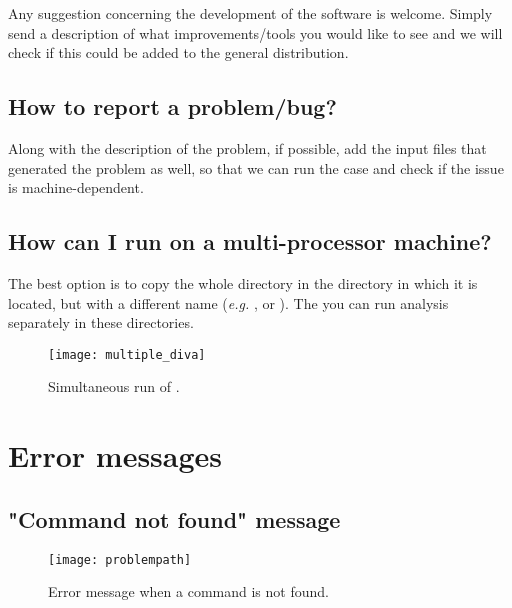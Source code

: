 Any suggestion concerning the development of the software is welcome. Simply send a description of what improvements/tools you would like to see and we will check if this could be added to the general distribution.


\subsection{How to report a problem/bug?} 

Along with the description of the problem, if possible, add the input files that generated the problem as well, so that we can run the case and check if the issue is machine-dependent. 

\subsection{How can I run \diva on a multi-processor machine?}

The best option is to copy the whole directory  in the directory in which it is located, but with a different name (\textit{e.g.} , or ). The you can run \diva analysis separately in these directories. 


\begin{figure}[htpb]
\centering
\texttt{[image: multiple\_diva]}
\caption{Simultaneous run of \diva.}
\end{figure}


\section{Error messages}

\subsection{"Command not found" message}


\begin{figure}[htpb]
\centering
\texttt{[image: problempath]}
\caption{Error message when a command is not found.}
\end{figure}

\subsubsection{\question}

